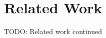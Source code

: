 \section{Related Work}
\label{sec:related}

TODO:
\vfill
\pagebreak
Related work continued
\vspace{15cm}

